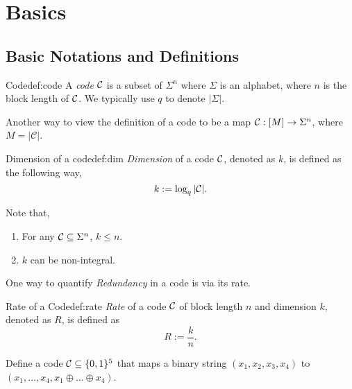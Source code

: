 \chapter{Basics}



\section{Basic Notations and Definitions}
  \begin{definition}{Code}{def:code}
  	A \textit{code} $\mathcal{C}$ is a subset of $ \Sigma^n$ where $\Sigma$ is an alphabet, where $n$ is the block length of $\mathcal{C}$. We typically use $q$ to denote $|\Sigma|$.
  \end{definition}
  Another way to view the definition of a code to be a map $\mathcal{C}: [M]\to \Sigma^n$, where $M = |\mathcal{C}|$. 
  \begin{definition}{Dimension of a code}{def:dim}
  	\textit{Dimension} of a code $\mathcal{C}$, denoted as $k$, is defined as the following way, 
  	\[
  	k := \log_q|\mathcal{C}|.
  	\]
  \end{definition}
  	\begin{remark} Note that, 
\begin{enumerate}
		\item For any $\mathcal{C}\subseteq\Sigma^n$, $k\leq n$.
	\item $k$ can be non-integral.
\end{enumerate}
\end{remark}

One way to quantify \textit{Redundancy} in a code is via its rate.
\begin{definition}{Rate of a Code}{def:rate}
	\textit{Rate} of a code $\mathcal{C}$ of block length $n$ and dimension $k$, denoted as $R$, is defined as 
	\[
	R := \frac{k}{n}.
	\]
\end{definition}

\begin{example}
Define a code $\mathcal{C}\subseteq\{0,1\}^5$ that maps a binary string $(x_1, x_2, x_3, x_4)$ to $(x_1, \ldots, x_4, x_1\oplus\ldots\oplus x_4)$.
\end{example}



